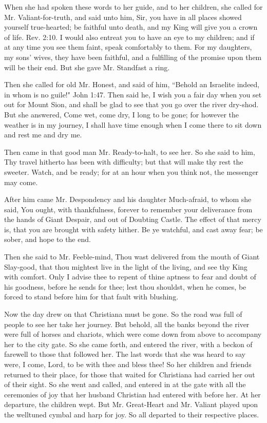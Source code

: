 When she had spoken these words to her guide, and to her children, she called for Mr. Valiant-for-truth, and said unto him, Sir, you have in all places showed yourself true-hearted; be faithful unto death, and my King will give you a crown of life. Rev. 2:10. I would also entreat you to have an eye to my children; and if at any time you see them faint, speak comfortably to them. For my daughters, my sons' wives, they have been faithful, and a fulfilling of the promise upon them will be their end. But she gave Mr. Standfast a ring.

Then she called for old Mr. Honest, and said of him, ``Behold an Israelite indeed, in whom is no guile!" John 1:47. Then said he, I wish you a fair day when you set out for Mount Sion, and shall be glad to see that you go over the river dry-shod. But she answered, Come wet, come dry, I long to be gone; for however the weather is in my journey, I shall have time enough when I come there to sit down and rest me and dry me.

Then came in that good man Mr. Ready-to-halt, to see her. So she said to him, Thy travel hitherto has been with difficulty; but that will make thy rest the sweeter. Watch, and be ready; for at an hour when you think not, the messenger may come.

After him came Mr. Despondency and his daughter Much-afraid, to whom she said, You ought, with thankfulness, forever to remember your deliverance from the hands of Giant Despair, and out of Doubting Castle. The effect of that mercy is, that you are brought with safety hither. Be ye watchful, and cast away fear; be sober, and hope to the end.

Then she said to Mr. Feeble-mind, Thou wast delivered from the mouth of Giant Slay-good, that thou mightest live in the light of the living, and see thy King with comfort. Only I advise thee to repent of thine aptness to fear and doubt of his goodness, before he sends for thee; lest thou shouldst, when he comes, be forced to stand before him for that fault with blushing.

Now the day drew on that Christiana must be gone. So the road was full of people to see her take her journey. But behold, all the banks beyond the river were full of horses and chariots, which were come down from above to accompany her to the city gate. So she came forth, and entered the river, with a beckon of farewell to those that followed her. The last words that she was heard to say were, I come, Lord, to be with thee and bless thee! So her children and friends returned to their place, for those that waited for Christiana had carried her out of their sight. So she went and called, and entered in at the gate with all the ceremonies of joy that her husband Christian had entered with before her. At her departure, the children wept. But Mr. Great-Heart and Mr. Valiant played upon the welltuned cymbal and harp for joy. So all departed to their respective places.

